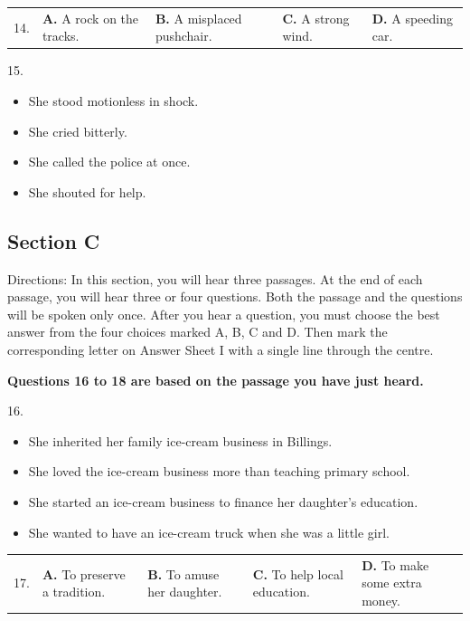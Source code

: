 \documentclass[UTF8,11pt]{ctexart}
\begin{document}
\noindent\begin{tabularx}{\linewidth}{@{}lXXXX@{}}14. & \textbf{A.} A rock on the tracks. & \textbf{B.} A misplaced pushchair. & \textbf{C.} A strong wind. & \textbf{D.} A speeding car.\\\end{tabularx}\par

15.


\begin{itemize}[leftmargin=2em,itemsep=.2em,topsep=.4em]\item[A.] She stood motionless in shock.
\item[B.] She cried bitterly.
\item[C.] She called the police at once.
\item[D.] She shouted for help.
\end{itemize}

\subsection*{\textbf{Section C}}


Directions: In this section, you will hear three passages. At the end of each passage, you will hear three or four questions. Both the passage and the questions will be spoken only once. After you hear a question, you must choose the best answer from the four choices marked A, B, C and D. Then mark the corresponding letter on Answer Sheet I with a single line through the centre.


\textbf{Questions 16 to 18 are based on the passage you have just heard.}


16.


\begin{itemize}[leftmargin=2em,itemsep=.2em,topsep=.4em]\item[A.] She inherited her family ice-cream business in Billings.
\item[B.] She loved the ice-cream business more than teaching primary school.
\item[C.] She started an ice-cream business to finance her daughter's education.
\item[D.] She wanted to have an ice-cream truck when she was a little girl.
\end{itemize}

\noindent\begin{tabularx}{\linewidth}{@{}lXXXX@{}}17. & \textbf{A.} To preserve a tradition. & \textbf{B.} To amuse her daughter. & \textbf{C.} To help local education. & \textbf{D.} To make some extra money.\\\end{tabularx}\par
\end{document}
